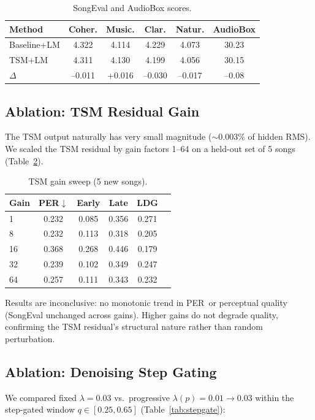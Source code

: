 \documentclass[11pt,a4paper]{article}
\newcommand{\per}{PER}
\begin{document}
\begin{table}[h]
\centering
\caption{SongEval and AudioBox scores.}
\label{tab:perceptual}
\begin{tabular}{lccccc}
\toprule
Method & Coher. & Music. & Clar. & Natur. & AudioBox \\
\midrule
Baseline+LM & 4.322 & 4.114 & 4.229 & 4.073 & 30.23 \\
TSM+LM & 4.311 & 4.130 & 4.199 & 4.056 & 30.15 \\
$\Delta$ & --0.011 & +0.016 & --0.030 & --0.017 & --0.08 \\
\bottomrule
\end{tabular}
\end{table}

\subsection{Ablation: TSM Residual Gain}

The TSM output naturally has very small magnitude ($\sim$0.003\% of hidden RMS). We scaled the TSM residual by gain factors 1--64 on a held-out set of 5 songs (Table~\ref{tab:gain}).

\begin{table}[h]
\centering
\caption{TSM gain sweep (5 new songs).}
\label{tab:gain}
\begin{tabular}{lccccc}
\toprule
Gain & \per$\downarrow$ & Early & Late & LDG \\
\midrule
1 & 0.232 & 0.085 & 0.356 & 0.271 \\
8 & 0.232 & 0.113 & 0.318 & 0.205 \\
16 & 0.368 & 0.268 & 0.446 & 0.179 \\
32 & 0.239 & 0.102 & 0.349 & 0.247 \\
64 & 0.257 & 0.111 & 0.343 & 0.232 \\
\bottomrule
\end{tabular}
\end{table}

Results are inconclusive: no monotonic trend in \per~or perceptual quality (SongEval unchanged across gains). Higher gains do not degrade quality, confirming the TSM residual's structural nature rather than random perturbation.

\subsection{Ablation: Denoising Step Gating}

We compared fixed $\lambda=0.03$ vs.\ progressive $\lambda(p)=0.01\to0.03$ within the step-gated window $q\in[0.25,0.65]$ (Table~\ref{tab:stepgate}):
\end{document}
